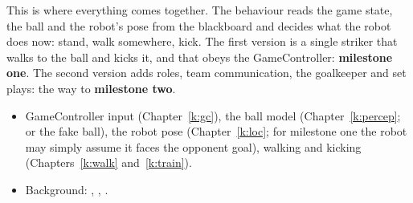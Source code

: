 \label{k:beh}

This is where everything comes together. The behaviour reads the game state, the ball and the robot's pose from the blackboard and decides what the robot does now: stand, walk somewhere, kick. The first version is a single striker that walks to the ball and kicks it, and that obeys the GameController: \textbf{milestone one}. The second version adds roles, team communication, the goalkeeper and set plays: the way to \textbf{milestone two}.

\begin{needbox}
\begin{itemize}[nosep]
  \item GameController input (Chapter~\ref{k:gc}), the ball model (Chapter~\ref{k:percep}; or the fake ball), the robot pose (Chapter~\ref{k:loc}; for milestone one the robot may simply assume it faces the opponent goal), walking and kicking (Chapters~\ref{k:walk} and~\ref{k:train}).
  \item Background: , , .
\end{itemize}
\end{needbox}

